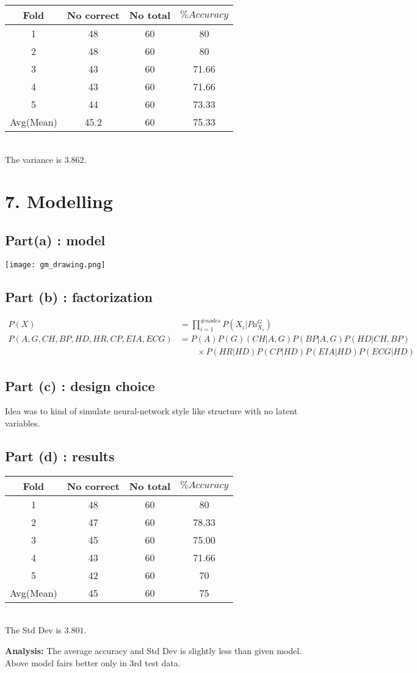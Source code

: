 \documentclass[a4paper,10pt]{report}
\begin{document}
\begin{tabular}{|c|c|c|c|}\hline
Fold & No correct & No total & $\% Accuracy $  \\ \hline\hline
1 & 48 & 60 & 80 \\ \hline
2 & 48 & 60 & 80 \\ \hline
3 & 43 & 60 & 71.66 \\ \hline
4 & 43 & 60 & 71.66 \\ \hline
5 & 44 & 60 & 73.33\\ \hline\hline
Avg(Mean) & 45.2 & 60 & 75.33 \\\hline
\end{tabular}
\vspace{1em} \\
The variance is $3.862$.

\section*{7. Modelling}
\subsection*{Part(a) : model}
\begin{center}
    \texttt{[image: gm\_drawing.png]}
\end{center}
\subsection*{Part (b) : factorization}
\begin{align*}
P(X) &= \prod_{i=1}^{\# nodes} P(X_i | Pa_{X_i}^{G}) \\
 P(A, G, CH, BP, HD, HR, CP, EIA, ECG) &= P(A)P(G)(CH | A, G)P(BP | A, G)P(HD | CH, BP)
                              \nonumber \\ &\qquad{} \times P(HR | HD) P(CP | HD)P(EIA|HD)P(ECG |HD) 
\end{align*}
\subsection*{Part (c) : design choice}
Idea was to kind of simulate neural-network style like structure with no latent variables. 
\subsection*{Part (d) : results}
\begin{tabular}{|c|c|c|c|}\hline
Fold & No correct & No total & $\% Accuracy $  \\ \hline\hline
1 & 48 & 60 & 80 \\ \hline
2 & 47 & 60 & 78.33 \\ \hline
3 & 45 & 60 & 75.00 \\ \hline
4 & 43 & 60 & 71.66 \\ \hline
5 & 42 & 60 & 70\\ \hline\hline
Avg(Mean) & 45 & 60 & 75 \\\hline
\end{tabular}
\vspace{1em} \\
The Std Dev is $3.801$.

\textbf{Analysis: } The average accuracy and Std Dev is slightly less than given model. Above model fairs better only in 3rd test data.
\end{document}
